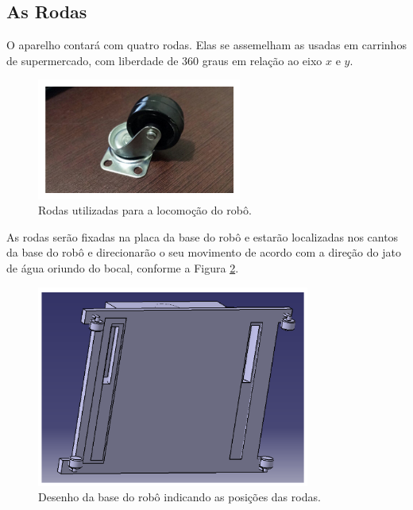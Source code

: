 \subsection{As Rodas}
O aparelho contará com quatro rodas. Elas se assemelham as usadas em carrinhos de supermercado, com liberdade de 360 graus em relação ao eixo $x$ e $y$.
\par
  \begin{figure}[h]
    \centering
    \includegraphics[width=0.6\textwidth]{figures/wheel-market.png}
    \caption{Rodas utilizadas para a locomoção do robô.}
    \label{fig:wheel-market}
  \end{figure}
  \FloatBarrier
\par
As rodas serão fixadas na placa da base do robô e estarão localizadas nos cantos da base do robô e direcionarão o seu movimento de acordo com a direção do jato de água oriundo do bocal, conforme a Figura \ref{fig:catia-base}.
\par
  \begin{figure}[h]
    \centering
    \includegraphics[width=0.8\textwidth]{figures/catia-base.png}
    \caption{Desenho da base do robô indicando as posições das rodas.}
    \label{fig:catia-base}
  \end{figure}
  \FloatBarrier
\par

